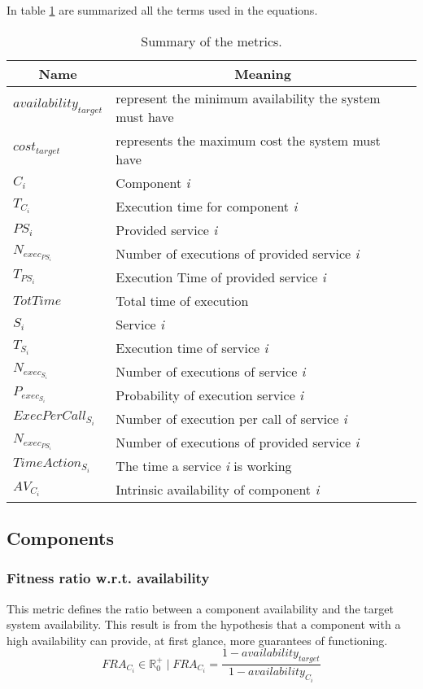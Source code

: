 In table \ref{tab:new-metrics-summary} are summarized all the terms used in the equations.

\begin{table}[ht!b]
	\centering
	\begin{tabular}{|l|l|}
		\hline
		\multicolumn{1}{|c|}{Name} & \multicolumn{1}{c|}{Meaning} \\
		\hline 
		$availability_{target}$ & represent the minimum availability the system must have \\
		\hline
		$cost_{target}$ & represents the maximum cost the system must have \\ 
		\hline
		$C_i$ & Component \emph{i} \\ 
		\hline
		$T_{C_i}$ & Execution time for component \emph{i} \\
		\hline
		$PS_i$ & Provided service \emph{i} \\
		\hline
		$N_{exec_{PS_i}}$ & Number of executions of provided service \emph{i} \\
		\hline
		$T_{PS_i}$ & Execution Time of provided service \emph{i} \\
		\hline
		$TotTime$ & Total time of execution \\
		\hline
		$S_i$ & Service \emph{i} \\
		\hline
		$T_{S_i}$ & Execution time of service \emph{i} \\
		\hline
		$N_{exec_{S_i}}$ & Number of executions of service \emph{i} \\
		\hline
		$P_{exec_{S_i}}$ & Probability of execution service \emph{i} \\
		\hline
		$ExecPerCall_{S_i}$ & Number of execution per call of service \emph{i} \\
		\hline
		$N_{exec_{PS_i}}$ &  Number of executions of provided service \emph{i} \\
		\hline
		$TimeAction_{S_i}$ & The time a service \emph{i} is working \\
		\hline
		$AV_{C_i}$ & Intrinsic availability of component \emph{i} \\
		\hline
	\end{tabular} 
	\caption[New Metrics]{Summary of the metrics.}
	\label{tab:new-metrics-summary}
\end{table}

\subsection{Components}
\subsubsection{Fitness ratio w.r.t. availability}
This metric defines the ratio between a component availability and the target system availability. This result is from the hypothesis that a component with a high availability can provide, at first glance, more guarantees of functioning. 
\[ FRA_{C_i} \in \mathbb{R}^+_0 \; | \; FRA_{C_i} = \frac{1 - availability_{target}}{1- availability_{C_i}} \]

